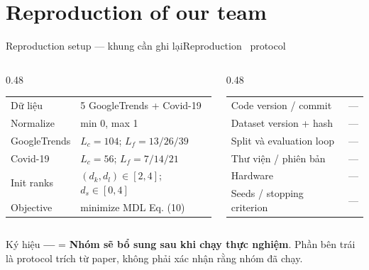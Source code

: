 \section{Reproduction of our team}

\begin{frame}[shrink=30]{Reproduction setup --- khung cần ghi lại}{Reproduction \textperiodcentered\ protocol}
\begin{columns}[T,onlytextwidth]
\begin{column}{0.48\textwidth}
\begin{mathcard}
  \small
  \begin{tabular}{@{}ll@{}}
    Dữ liệu & 5 GoogleTrends + Covid-19\\
    Normalize & min 0, max 1\\
    GoogleTrends & $L_c{=}104$; $L_f{=}13/26/39$\\
    Covid-19 & $L_c{=}56$; $L_f{=}7/14/21$\\
    Init ranks & $(d_k,d_l){\in}[2,4]$; $d_s{\in}[0,4]$\\
    Objective & minimize MDL Eq. (10)
  \end{tabular}
\end{mathcard}
\end{column}
\begin{column}{0.48\textwidth}
\begin{questioncard}
  \par
  \small
  \begin{tabular}{@{}ll@{}}
    Code version / commit & ---\\
    Dataset version + hash & ---\\
    Split và evaluation loop & ---\\
    Thư viện / phiên bản & ---\\
    Hardware & ---\\
    Seeds / stopping criterion & ---
  \end{tabular}
\end{questioncard}
\end{column}
\end{columns}
\vspace{5mm}
\begin{intuition}
  Ký hiệu \textbf{---} = \textbf{Nhóm sẽ bổ sung sau khi chạy thực nghiệm}. Phần bên trái là protocol trích từ paper, không phải xác nhận rằng nhóm đã chạy.
\end{intuition}
\vspace{3mm}
\end{frame}

